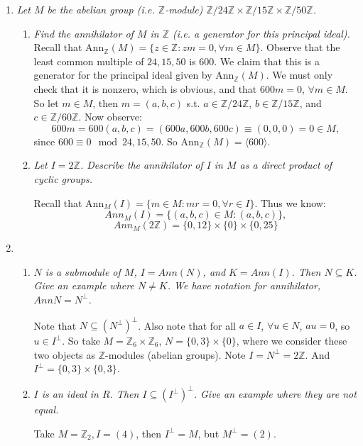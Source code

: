 \documentclass[12pt]{amsbook}
\theoremstyle{plain}
\numberwithin{section}{chapter}
\numberwithin{equation}{chapter}
\theoremstyle{definition}
\theoremstyle{remark}
\newcommand{\sub}{\subseteq}
\newcommand{\z}{\mathbb{Z}}
\begin{document}
\begin{enumerate}[label=\arabic*.]
\item \textit{Let $M$ be the abelian group (i.e. $\z$-module) $\z/24\z \times \z/15\z \times \z/50\z$. }
\begin{enumerate}
\item \textit{Find the annihilator of $M$ in $\z$ (i.e. a generator for this principal ideal). }\\
Recall that Ann$_{\z}(M) = \{z \in \z:zm = 0 ,\forall m \in M\}$. Observe that the least common multiple of $24,15,50$ is $600$. We claim that this is a generator for the principal ideal given by Ann$_\z(M)$. We must only check that it is nonzero, which is obvious, and that $600m = 0$, $\forall m \in M$. So let $m \in M$, then $m = (a,b,c)$ s.t. $a \in \z/24\z$, $b \in \z/15\z$, and $c \in \z/60\z$. Now observe:
$$
600m = 600(a,b,c) = (600a,600b,600c) \equiv (0,0,0) = 0 \in M,
$$
since $600 \equiv 0 \mod 24,15,50$. So Ann$_\z(M) = \langle 600 \rangle$. 
\item \textit{Let $I = 2\z$. Describe the annihilator of $I$ in $M$ as a direct product of cyclic groups. }


Recall that Ann$_M(I) = \{m \in M: mr = 0,\forall r \in I\}$. Thus we know: 
$$
Ann_M(I) = \{(a,b,c) \in M: (a,b,c)\},
$$
$$
Ann_M(2\z) = \{0,12\} \times \{0\} \times \{0,25\}
$$

\end{enumerate}

\item

\begin{enumerate}



\item \textit{$N$ is a submodule of $M$, $I = Ann(N)$, and $K = Ann(I)$. Then $N \sub K$. Give an example where $N \neq K$. We have notation for annihilator, $AnnN = N^{\perp}$. }

Note that $N \sub (N^\perp)^\perp$. Also note that for all $a \in I$, $\forall u \in N$, $au = 0$, so $u \in I^\perp$. So take $M = \z_6 \times \z_6$, $N = \{0,3\} \times \{0\}$, where we consider these two objects as $\z$-modules (abelian groups). Note $I = N^\perp = 2\z$. And $I^\perp = \{0,3\} \times \{0,3\}$. 

\item \textit{$I$ is an ideal in $R$. Then $I \sub (I^\perp)^\perp$. Give an example where they are not equal. }

Take $M = \z_2, I = (4)$, then $I^\perp = M$, but $M^\perp = (2)$. 




\end{enumerate}
\end{enumerate}
\end{document}
